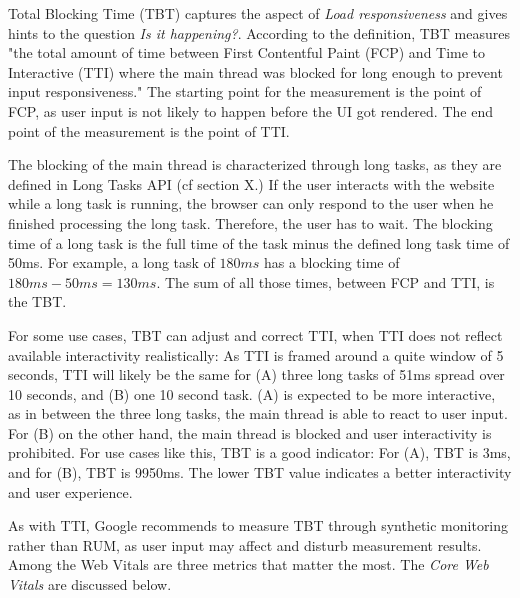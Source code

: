 
Total Blocking Time (TBT) captures the aspect of \textit{Load responsiveness} and gives hints to the question \textit{Is it happening?}.
According to the definition, TBT measures "the total amount of time between First Contentful Paint (FCP) and Time to Interactive (TTI) where the main thread was blocked for long enough to prevent input responsiveness." %
The starting point for the measurement is the point of FCP, as user input is not likely to happen before the UI got rendered.
The end point of the measurement is the point of TTI.

The blocking of the main thread is characterized through long tasks, as they are defined in Long Tasks API (cf section X.)
If the user interacts with the website while a long task is running, the browser can only respond to the user when he finished processing the long task.
Therefore, the user has to wait.
The blocking time of a long task is the full time of the task minus the defined long task time of 50ms.
For example, a long task of $180ms$ has a blocking time of $180ms - 50ms = 130ms$.
The sum of all those times, between FCP and TTI, is the TBT.



For some use cases, TBT can adjust and correct TTI, when TTI does not reflect available interactivity realistically:
As TTI is framed around a quite window of 5 seconds, TTI will likely be the same for (A) three long tasks of 51ms spread over 10 seconds, and (B) one 10 second task.
(A) is expected to be more interactive, as in between the three long tasks, the main thread is able to react to user input.
For (B) on the other hand, the main thread is blocked and user interactivity is prohibited.
For use cases like this, TBT is a good indicator:
For (A), TBT is 3ms, and for (B), TBT is 9950ms.
The lower TBT value indicates a better interactivity and user experience.

As with TTI, Google recommends to measure TBT through synthetic monitoring rather than RUM, as user input may affect and disturb measurement results.  \\









Among the Web Vitals are three metrics that matter the most.
The \textit{Core Web Vitals} are discussed below.



